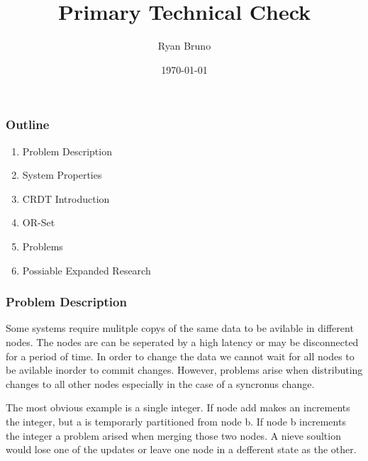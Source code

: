 \documentclass{beamer}
\title{Primary Technical Check}
\author{Ryan Bruno}
\date{\today}
\begin{document}
\begin{frame}
\titlepage
\end{frame}

\begin{frame}
\frametitle{Outline}
\begin{enumerate}
    \item Problem Description
    \item System Properties
    \item CRDT Introduction
    \item OR-Set
    \item Problems
    \item Possiable Expanded Research
\end{enumerate}
\tableofcontents

\end{frame}

\begin{frame}
\frametitle{Problem Description}

Some systems require mulitple copys of the same data to be avilable in different nodes. The nodes are can be seperated by a high latency or may be disconnected for a period of time. In order to change the data we cannot wait for all nodes to be avilable inorder to commit changes. However, problems arise when distributing changes to all other nodes especially in the case of a syncronus change. 

The most obvious example is a single integer. If node add makes an increments the integer, but a is temporarly partitioned from node b. If node b increments the integer a problem arised when merging those two nodes. A nieve soultion would lose one of the updates or leave one node in a defferent state as the other.

\end{frame}
\end{document}
